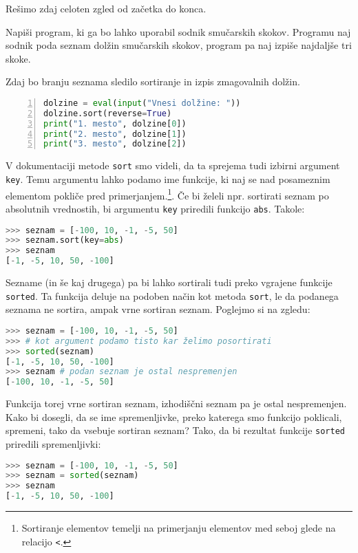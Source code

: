 Rešimo zdaj celoten zgled od začetka do konca.
\begin{zgled}
Napiši program, ki ga bo lahko uporabil sodnik smučarskih skokov. Programu naj sodnik poda seznam dolžin smučarskih skokov, program pa naj izpiše najdaljše tri skoke.
\end{zgled}

\begin{resitev}
Zdaj bo branju seznama sledilo sortiranje in izpis zmagovalnih dolžin.
\begin{lstlisting}[language=Python,numbers=left]
dolzine = eval(input("Vnesi dolžine: "))
dolzine.sort(reverse=True)
print("1. mesto", dolzine[0])
print("2. mesto", dolzine[1])
print("3. mesto", dolzine[2])
\end{lstlisting}
\end{resitev}

V dokumentaciji metode \texttt{sort} smo videli, da ta sprejema tudi izbirni argument \texttt{key}. Temu argumentu lahko podamo ime funkcije, ki naj se nad posameznim elementom pokliče pred primerjanjem.\footnote{Sortiranje elementov temelji na primerjanju elementov med seboj glede na relacijo \texttt{<}.}. Če bi želeli npr. sortirati seznam po absolutnih vrednostih, bi argumentu \texttt{key} priredili funkcijo \texttt{abs}. Takole:
\begin{lstlisting}[language=Python]
>>> seznam = [-100, 10, -1, -5, 50]
>>> seznam.sort(key=abs)
>>> seznam
[-1, -5, 10, 50, -100]
\end{lstlisting}

Sezname (in še kaj drugega) pa bi lahko sortirali tudi preko vgrajene funkcije \texttt{sorted}. Ta funkcija deluje na podoben način kot metoda \texttt{sort}, le da podanega seznama ne sortira, ampak vrne sortiran seznam. Poglejmo si na zgledu:
\begin{lstlisting}[language=Python]
>>> seznam = [-100, 10, -1, -5, 50]
>>> # kot argument podamo tisto kar želimo posortirati
>>> sorted(seznam) 
[-1, -5, 10, 50, -100]
>>> seznam # podan seznam je ostal nespremenjen
[-100, 10, -1, -5, 50]
\end{lstlisting}
Funkcija torej vrne sortiran seznam, izhodiščni seznam pa je ostal nespremenjen. Kako bi dosegli, da se ime spremenljivke, preko katerega smo funkcijo poklicali, spremeni, tako da vsebuje sortiran seznam? Tako, da bi rezultat funkcije \texttt{sorted} priredili spremenljivki:
\begin{lstlisting}[language=Python]
>>> seznam = [-100, 10, -1, -5, 50]
>>> seznam = sorted(seznam)
>>> seznam
[-1, -5, 10, 50, -100]
\end{lstlisting}

